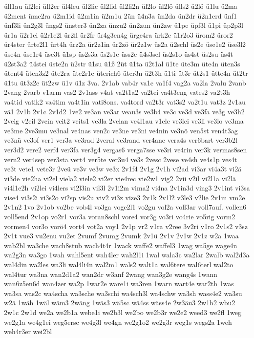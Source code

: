 {üll1au
ül2lei
üll2er
ül4leu
ül2lic
ül2lid
ül2li2n
ül2lo
ül2lö
ülls2
ü2lö
ü1lu
ü2ma
ü2ment
üme2ra
ü2m1id
ü2m1in
ü2m1u
2ün
ü4n3a
ün2da
ün2dr
ü2n1erd
ünf1
ünf3li
ün2g3l
üngs2
ünster3
ün2za
ünzu2
ün2zun
ün2zw
ü1pe
üpf3l
ü1pi
üp2p3l
ür1a
ü2r1ei
ü2r1e2l
ür2fl
ür2fr
ür4g3en4g
ürge4ra
ürk2e
ü1r2o3
ürom2
üror2
ür4ster
ürte2l1
ürt4h
ürz2a
ür2z1in
ür2zö
ür2z1w
üs2a
ü2schl
üs2e
üse1e2
üse3l2
üse4n
üse1r4
üse3t
ü1sp
üs2s3a
üs2s1c
üss2e
ü4s3sel
üs2s1o
üs4st
üs2su
üs4t
ü2st3a2
ü4stei
üste2n
ü2str
ü1su
ü1ß
2üt
ü1ta
ü2t1al
ü1te
üte3m
üte4n
üten3s
ütent4
üten3z2
üte2ra
üte2r1e
üterich6
üter3n
ü2t3h
ü1ti
üt3r
üt2s1
ütte4n
üt2tr
ü1tu
üt3z2e
üt2zw
ü1v
ü1z
3va.
2v1ab
vab4r
va1c
va1f4
vag2a
va2la
2valu
2vanb
2vang
2varb
v1arm
vas2
2v1ass
v4at
va2t1a2
va2tei
va4t3eng
vates2
va2t3h
va4tid
vatik2
va4tim
va4t1in
vati8ons.
va4tord
va2t3r
vat3s2
va2t1u
vat3z
2v1au
vä1
2v1b
2v1c
2v1d2
1ve2
ve3an
ve3ar
veau3s
ve3b4
ve3c
ve3d
ve3fa
ve3g
ve3h2
2veig
v2eil
2vein
veit2
veits1
ve3la
2velan
ve4l1au
v1ele
ve3lei
ve3li
ve3lo
ve3ma
ve3me
2ve3mu
ve3nal
ve4nas
ven2c
ve3ne
ve3ni
ve4nin
ve3nö
ven5st
ven4t3ag
ve3nü
ve3of
ver1
ver3a
ve3rad
2veral
ve3rand
ver4ane
vera4s
ver6bart
ver3b2l
ver3d2
vere2
verf4
ver3fa
ver3g4
vergas6
verga7sse
ve3ri
ve4rin
ver3k
vermas8sen
vern2
ver4sep
ver3sta
vert4
ver5te
ver3u4
ve3s
2vesc
2vese
ve4sh
ve4s1p
ves4t
ve3t
vete1
vete3r
2veü
ve3v
ve3w
ve3x
2v1f4
2v1g
2v1h
vi2ad
vi3ar
vi4a3t
vi2ä
vi3de
vie2ha
vi2el
viela2
viele2
vi2er
vie4rec
vie2w1
vig2
2vii
v2il
vi2l1a
vi2lä
vi4l1e2h
vi2lei
vi4lers
vi2l3in
vil3l
2v1i2m
vima2
vi4na
2v1in3d
ving3
2v1int
vi3sa
vise4
vi3s2i
vi3s2o
vi2sp
vis2u
viv2
vi3z
vize3
2v1k
2v1l2
v3le3
v2lie
2v1m
vm2e
2v1n2
1vo
2v1ob
vo2be
vob4l
vo3ga
voge2l1
vo2gu
vol2a
voll3ar
voll7auf.
vollen6
voll5end
2v1op
vo2r1
vor3a
voran8schl
vore4
vor3g
vo3ri
vo4rie
vo5rig
vorm2
vormen4
vor3o
vorö4
vort4
vot2a
voy1
2v1p
vr2
v1ra
v2ree
3v2ri
v1ro
2v1s2
v3sz
2v1t
vue3
vu2enu
vu2et
2vumf
2vumg
2vumk
2v1ü
2v1v
2v1w
2v1z
w2a
1waa
wab2bl
wa3che
wach8stub
wach4t4r
1wack
waffe2
waffel3
1wag
wa5ge
wage4n
wa2g3n
wa3go
1wah
wahl5ent
wah4ler
wah2l1i
1wal
wala3c
wa2lar
2walb
wal2d3a
wal4din
wa2les
wa3li
wal4li4n
wal2m1
wals2
walt1a
wal6tere
wal6terl
wal2to
wal4tur
wa3na
wan2d1a2
wan2dr
w3anf
2wang
wan3g2e
wang4s
1wann
wan6z5en6d
wan4zer
wa2p
1war2e
ware1i
wa3ren
1warn
wart4e
war2th
1was
wa3sa
was2c
wa4scha
wa3sche
wa3schi
wa4sch3l
wa4schw
wa3sh
wass4e2
wa3su
w2ä
1wäh
1wäl
wäm3
2wäng
1wäs3
wä5sc
wä4ss
wäss4e
2w3äu3
2w1b2
wbu2
2w1c
2w1d
we2a
we2b1a
webe1i
we2b3l
we2bo
we2b3r
we2e2
weed3
we2fl
1weg
we2g1a
we4g1ei
weg5ersc
we4g3l
we4gn
we2g1o2
we2g3r
weg1s
wegs2a
1weh
weh4r3er
wei2bl
}
